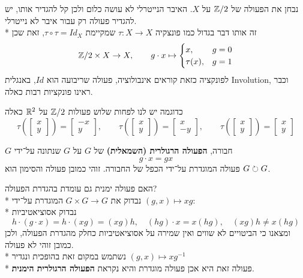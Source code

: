 \begin{definition}[אינבולוציה]
	נבחן את הפעולה של $\mathbb{Z}/2$ על $X$. האיבר הנייטרלי לא עושה כלום ולכן קל להגדיר אותו, יש להגדיר פעולה רק עבור איבר לא נייטרלי. \\*
	זה אותו דבר בגדול כמו פונצקיה $\tau : X \to X$ שמקיימת $\tau \circ \tau = Id_X$, זאת שכן
	\[
		\mathbb{Z}/2 \times X \to X, \qquad g \cdot x \mapsto \begin{cases}
			x, & g = 0 \\
			\tau(x), & g = 1
		\end{cases}
	\]
	לפונקציה כזאת קוראים אינבולוציה, פעולה שריבועה הוא $Id$, באנגלית Involution, וכבר ראינו פונקציות רבות כאלה.
\end{definition}

כדוגמה יש לנו לפחות שלוש פעולות $\mathbb{Z}/2$ על $\mathbb{R}^2$ כאלה
\[
	\tau( \begin{bmatrix} x \\ y \end{bmatrix}) = \begin{bmatrix} -x \\ y \end{bmatrix}, \qquad
	\tau( \begin{bmatrix} x \\ y \end{bmatrix}) = \begin{bmatrix} x \\ -y \end{bmatrix}, \qquad
	\tau( \begin{bmatrix} x \\ y \end{bmatrix}) = \begin{bmatrix} x \\ y \end{bmatrix}
\]

\begin{definition}
$G$ חבורה, \textbf{הפעולה הרגולרית (השמאלית)} של $G$ על $G$ שנתונה על־ידי
\[
	g \cdot x = gx
\]
פעולה המוגדרת על־ידי הכפל של החבורה. זוהי כמובן פעולה והסימון הוא $G \circlearrowright G$.
\end{definition}
האם פעולה ימנית גם עומדת בהגדרת הפעולה? \\*
נבדוק את $G \times G \to G$ המוגדרת על־ידי $(g, x) \mapsto xg$: \\*
נבדוק אסוציאטיביות
\[
	h \cdot (g \cdot x) = h \cdot (xg) = (xg)h, \quad (hg) \cdot x = x (hg), \quad (xg) h \ne x (hg)
\]
ומצאנו כי הביטויים לא שווים ואין שמירה על אסוציאטיביות כחלק מהגדרת הפעולה, ולכן כמובן זוהי לא פעולה. \\*
נשתמש במקום זאת בהופכית ונגדיר $(g, x) \mapsto x g^{-1}$ \\*
פעולה זאת היא אכן פעולה מוגדרת והיא נקראת \textbf{הפעולה הרגולרית הימנית}.

